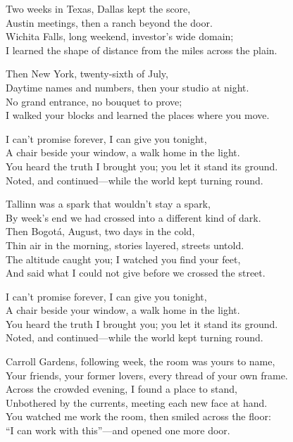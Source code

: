 \begin{lyrics}
Two weeks in Texas, Dallas kept the score,\\
Austin meetings, then a ranch beyond the door.\\
Wichita Falls, long weekend, investor’s wide domain;\\
I learned the shape of distance from the miles across the plain.

Then New York, twenty-sixth of July,\\
Daytime names and numbers, then your studio at night.\\
No grand entrance, no bouquet to prove;\\
I walked your blocks and learned the places where you move.

I can’t promise forever, I can give you tonight,\\
A chair beside your window, a walk home in the light.\\
You heard the truth I brought you; you let it stand its ground.\\
Noted, and continued—while the world kept turning round.

Tallinn was a spark that wouldn’t stay a spark,\\
By week’s end we had crossed into a different kind of dark.\\
Then Bogotá, August, two days in the cold,\\
Thin air in the morning, stories layered, streets untold.\\
The altitude caught you; I watched you find your feet,\\
And said what I could not give before we crossed the street.

I can’t promise forever, I can give you tonight,\\
A chair beside your window, a walk home in the light.\\
You heard the truth I brought you; you let it stand its ground.\\
Noted, and continued—while the world kept turning round.

Carroll Gardens, following week, the room was yours to name,\\
Your friends, your former lovers, every thread of your own frame.\\
Across the crowded evening, I found a place to stand,\\
Unbothered by the currents, meeting each new face at hand.\\
You watched me work the room, then smiled across the floor:\\
“I can work with this”—and opened one more door.


\end{lyrics}
